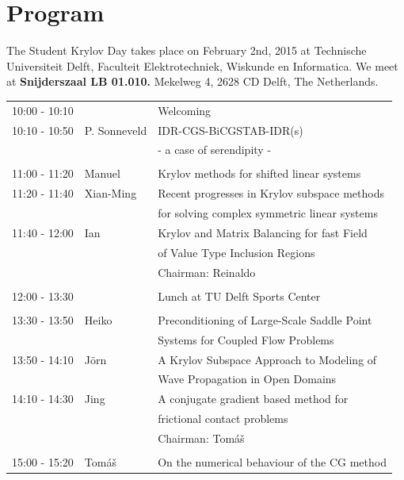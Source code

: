 \documentclass{article}
\begin{document}
\section*{Program}
The Student Krylov Day takes place on February 2nd, 2015 at Technische Universiteit Delft, 
    Faculteit Elektrotechniek, Wiskunde en Informatica. We meet at \textbf{Snijderszaal LB 01.010.}
Mekelweg 4, 2628 CD Delft, The Netherlands. \\ 
\begin{table}[h]
\begin{tabular}{lll}
10:00 - 10:10 &  & Welcoming \\ [0.5ex]
10:10 - 10:50 & P. Sonneveld & IDR-CGS-BiCGSTAB-IDR(s) \\
 & & - a case of serendipity -\\ [0.5ex]
\hline \\ [-1.5ex]
11:00 - 11:20 & Manuel & Krylov methods for shifted linear systems \\ [0.5ex]
11:20 - 11:40 & Xian-Ming & Recent progresses in Krylov subspace methods\\ 
                        & & for solving complex symmetric linear systems\\  [0.5ex]
11:40 - 12:00 & Ian & Krylov and Matrix Balancing for fast Field \\ 
              &     & of Value Type Inclusion Regions\\  [0.5ex]
& & \hfill \small{Chairman: Reinaldo }  \\
\hline \\ [-1.5ex]
12:00 - 13:30 & & Lunch at TU Delft Sports Center \\ [0.5ex]
\hline \\ [-1.5ex]
13:30 - 13:50 & Heiko & Preconditioning of Large-Scale Saddle Point \\
                    & & Systems for Coupled Flow Problems\\ [0.5ex]
13:50 - 14:10 &J\"orn & A Krylov Subspace Approach to Modeling of \\
                     & & Wave Propagation in Open Domains\\ [0.5ex]
14:10 - 14:30 & Jing & A conjugate gradient based method for \\
                   & & frictional contact problems\\ [0.5ex]
& & \hfill \small{Chairman: Tom{\'a}{\v s}} \\
\hline \\ [-1.5ex]
15:00 - 15:20 & Tom{\'a}{\v s} & On the numerical behaviour of the CG method\\ [0.5ex]

\end{tabular}
\end{table}
\end{document}
